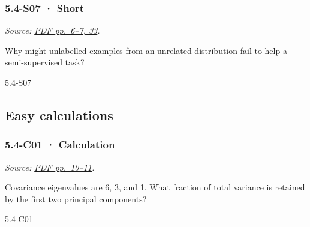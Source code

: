 \noindent\begin{minipage}{\linewidth}

\subsubsection{5.4-S07 · Short}\label{s07-short-15}

\emph{Source:
\href{../Lecture\%20Slides/5.4.\%20Unsupervised\%20learning.pdf\#page=6}{PDF
pp.~6--7, 33}.}

Why might unlabelled examples from an unrelated distribution fail to
help a semi-supervised task?

\begin{solution}[20mm]{5.4-S07}

\end{solution}
\end{minipage}\par\medskip

\subsection{Easy calculations}\label{easy-calculations-16}

\noindent\begin{minipage}{\linewidth}

\subsubsection{5.4-C01 · Calculation}\label{c01-calculation-15}

\emph{Source:
\href{../Lecture\%20Slides/5.4.\%20Unsupervised\%20learning.pdf\#page=10}{PDF
pp.~10--11}.}

Covariance eigenvalues are 6, 3, and 1. What fraction of total variance
is retained by the first two principal components?

\begin{solution}[26mm]{5.4-C01}

\end{solution}
\end{minipage}\par\medskip

